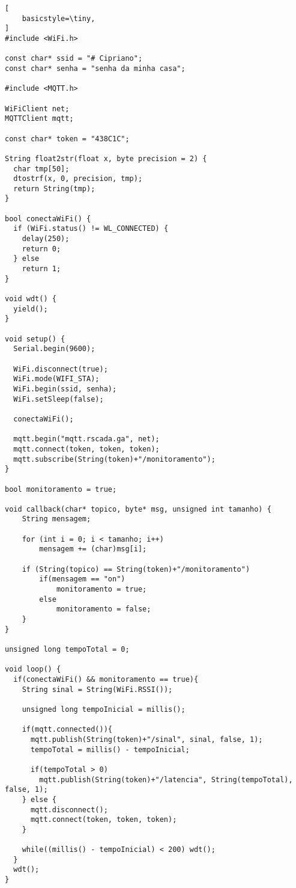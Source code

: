 \label{an:anexo-wifi}

\begin{lstlisting}[
    basicstyle=\tiny,
]
#include <WiFi.h>

const char* ssid = "# Cipriano";
const char* senha = "senha da minha casa";

#include <MQTT.h>

WiFiClient net;
MQTTClient mqtt;

const char* token = "438C1C";

String float2str(float x, byte precision = 2) {
  char tmp[50];
  dtostrf(x, 0, precision, tmp);
  return String(tmp);
}

bool conectaWiFi() {
  if (WiFi.status() != WL_CONNECTED) {
    delay(250);
    return 0;
  } else
    return 1;
}

void wdt() {
  yield();
}

void setup() {
  Serial.begin(9600);

  WiFi.disconnect(true);
  WiFi.mode(WIFI_STA);
  WiFi.begin(ssid, senha);
  WiFi.setSleep(false);
  
  conectaWiFi();
    
  mqtt.begin("mqtt.rscada.ga", net);
  mqtt.connect(token, token, token);
  mqtt.subscribe(String(token)+"/monitoramento");
}

bool monitoramento = true;

void callback(char* topico, byte* msg, unsigned int tamanho) {
    String mensagem;
  
	for (int i = 0; i < tamanho; i++)
		mensagem += (char)msg[i];

	if (String(topico) == String(token)+"/monitoramento")
		if(mensagem == "on")
			monitoramento = true;
		else
			monitoramento = false;
  	}
}

unsigned long tempoTotal = 0;
  
void loop() {
  if(conectaWiFi() && monitoramento == true){
    String sinal = String(WiFi.RSSI());

    unsigned long tempoInicial = millis();    

    if(mqtt.connected()){
      mqtt.publish(String(token)+"/sinal", sinal, false, 1);
      tempoTotal = millis() - tempoInicial;

      if(tempoTotal > 0)
        mqtt.publish(String(token)+"/latencia", String(tempoTotal), false, 1);
    } else {
      mqtt.disconnect();
      mqtt.connect(token, token, token);
    }

    while((millis() - tempoInicial) < 200) wdt();
  }
  wdt();
}
\end{lstlisting}